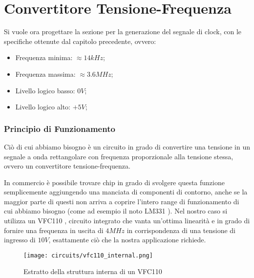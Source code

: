 \chapter{Convertitore Tensione-Frequenza}


Si vuole ora progettare la sezione per la generazione del segnale di clock, con le specifiche
ottenute dal capitolo precedente, ovvero:

\begin{itemize}
    \item Frequenza minima: $\approx 14kHz$;
    \item Frequenza massima: $\approx 3.6MHz$;
    \item Livello logico basso: $0V$;
    \item Livello logico alto: $+5V$;
\end{itemize}


\subsection*{Principio di Funzionamento}


Ciò di cui abbiamo bisogno è un circuito in grado di convertire una tensione in un segnale
a onda rettangolare con frequenza proporzionale alla tensione stessa, ovvero un convertitore
tensione-frequenza.

In commercio è possibile trovare chip in grado di svolgere questa funzione semplicemente
aggiungendo una manciata di componenti di contorno, anche se la maggior parte di questi non
arriva a coprire l'intero range di funzionamento di cui abbiamo bisogno (come ad esempio
il noto LM331 \cite{lm331}). Nel nostro caso si utilizza un VFC110 \cite{vfc110},
circuito integrato che vanta un'ottima linearità e in grado di fornire una frequenza in
uscita di $4MHz$ in corrispondenza di una tensione di ingresso di $10V$, esattamente ciò
che la nostra applicazione richiede.
\medskip

\begin{figure}[ht]
    \centering
    \texttt{[image: circuits/vfc110\_internal.png]}
    \caption{Estratto della struttura interna di un VFC110}
    \label{vfc100_internal}
\end{figure}

